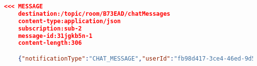\documentclass{../includes/TechDoc}
\begin{document}
    \begin{lstlisting}[language=json,caption={Пример ответа при работе с WebSocket протоколом}]
    <<< MESSAGE
	destination:/topic/room/B73EAD/chatMessages
	content-type:application/json
	subscription:sub-2
	message-id:31jgkb5n-1
	content-length:306

	{"notificationType":"CHAT_MESSAGE","userId":"fb98d417-3ce4-46ed-9d50-e9c8ebdcdd15","text":"Hello World!","dateTime":{"dayOfWeek":"TUESDAY","dayOfYear":131,"nano":973629000,"year":2021,"monthValue":5,"dayOfMonth":11,"hour":13,"minute":13,"second":18,"month":"MAY","chronology":{"id":"ISO","calendarType":"iso8601"}}}
    \end{lstlisting}

    \registrationList
\end{document}
